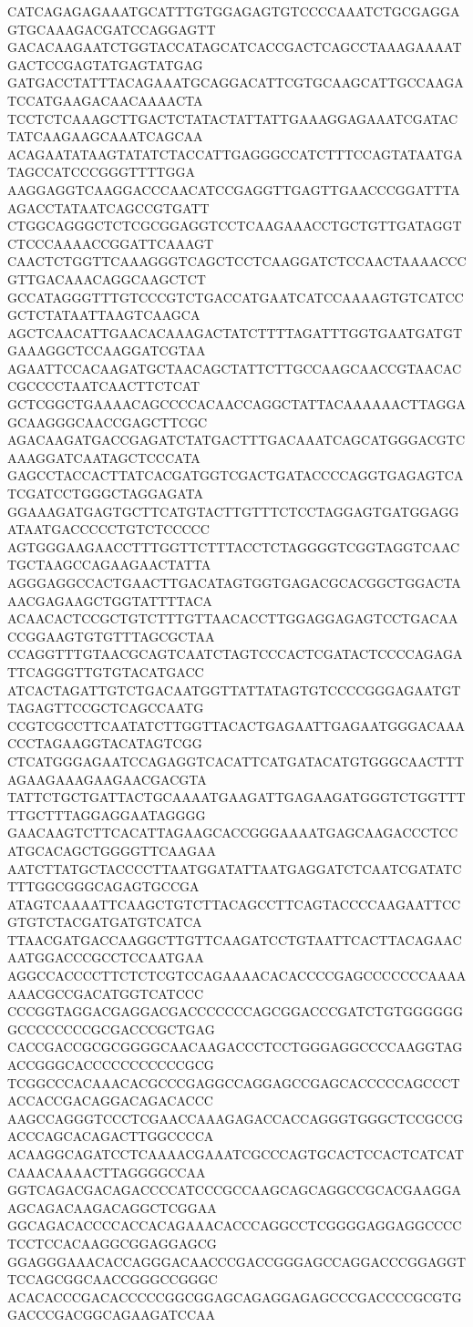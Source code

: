 CATCAGAGAGAAATGCATTTGTGGAGAGTGTCCCCAAATCTGCGAGGAGTGCAAAGACGATCCAGGAGTT
GACACAAGAATCTGGTACCATAGCATCACCGACTCAGCCTAAAGAAAATGACTCCGAGTATGAGTATGAG
GATGACCTATTTACAGAAATGCAGGACATTCGTGCAAGCATTGCCAAGATCCATGAAGACAACAAAACTA
TCCTCTCAAAGCTTGACTCTATACTATTATTGAAAGGAGAAATCGATACTATCAAGAAGCAAATCAGCAA
ACAGAATATAAGTATATCTACCATTGAGGGCCATCTTTCCAGTATAATGATAGCCATCCCGGGTTTTGGA
AAGGAGGTCAAGGACCCAACATCCGAGGTTGAGTTGAACCCGGATTTAAGACCTATAATCAGCCGTGATT
CTGGCAGGGCTCTCGCGGAGGTCCTCAAGAAACCTGCTGTTGATAGGTCTCCCAAAACCGGATTCAAAGT
CAACTCTGGTTCAAAGGGTCAGCTCCTCAAGGATCTCCAACTAAAACCCGTTGACAAACAGGCAAGCTCT
GCCATAGGGTTTGTCCCGTCTGACCATGAATCATCCAAAAGTGTCATCCGCTCTATAATTAAGTCAAGCA
AGCTCAACATTGAACACAAAGACTATCTTTTAGATTTGGTGAATGATGTGAAAGGCTCCAAGGATCGTAA
AGAATTCCACAAGATGCTAACAGCTATTCTTGCCAAGCAACCGTAACACCGCCCCTAATCAACTTCTCAT
GCTCGGCTGAAAACAGCCCCACAACCAGGCTATTACAAAAAACTTAGGAGCAAGGGCAACCGAGCTTCGC
AGACAAGATGACCGAGATCTATGACTTTGACAAATCAGCATGGGACGTCAAAGGATCAATAGCTCCCATA
GAGCCTACCACTTATCACGATGGTCGACTGATACCCCAGGTGAGAGTCATCGATCCTGGGCTAGGAGATA
GGAAAGATGAGTGCTTCATGTACTTGTTTCTCCTAGGAGTGATGGAGGATAATGACCCCCTGTCTCCCCC
AGTGGGAAGAACCTTTGGTTCTTTACCTCTAGGGGTCGGTAGGTCAACTGCTAAGCCAGAAGAACTATTA
AGGGAGGCCACTGAACTTGACATAGTGGTGAGACGCACGGCTGGACTAAACGAGAAGCTGGTATTTTACA
ACAACACTCCGCTGTCTTTGTTAACACCTTGGAGGAGAGTCCTGACAACCGGAAGTGTGTTTAGCGCTAA
CCAGGTTTGTAACGCAGTCAATCTAGTCCCACTCGATACTCCCCAGAGATTCAGGGTTGTGTACATGACC
ATCACTAGATTGTCTGACAATGGTTATTATAGTGTCCCCGGGAGAATGTTAGAGTTCCGCTCAGCCAATG
CCGTCGCCTTCAATATCTTGGTTACACTGAGAATTGAGAATGGGACAAACCCTAGAAGGTACATAGTCGG
CTCATGGGAGAATCCAGAGGTCACATTCATGATACATGTGGGCAACTTTAGAAGAAAGAAGAACGACGTA
TATTCTGCTGATTACTGCAAAATGAAGATTGAGAAGATGGGTCTGGTTTTTGCTTTAGGAGGAATAGGGG
GAACAAGTCTTCACATTAGAAGCACCGGGAAAATGAGCAAGACCCTCCATGCACAGCTGGGGTTCAAGAA
AATCTTATGCTACCCCTTAATGGATATTAATGAGGATCTCAATCGATATCTTTGGCGGGCAGAGTGCCGA
ATAGTCAAAATTCAAGCTGTCTTACAGCCTTCAGTACCCCAAGAATTCCGTGTCTACGATGATGTCATCA
TTAACGATGACCAAGGCTTGTTCAAGATCCTGTAATTCACTTACAGAACAATGGACCCGCCTCCAATGAA
AGGCCACCCCTTCTCTCGTCCAGAAAACACACCCCGAGCCCCCCCAAAAAAACGCCGACATGGTCATCCC
CCCGGTAGGACGAGGACGACCCCCCCAGCGGACCCGATCTGTGGGGGGGCCCCCCCCGCGACCCGCTGAG
CACCGACCGCGCGGGGCAACAAGACCCTCCTGGGAGGCCCCAAGGTAGACCGGGCACCCCCCCCCCCGCG
TCGGCCCACAAACACGCCCGAGGCCAGGAGCCGAGCACCCCCAGCCCTACCACCGACAGGACAGACACCC
AAGCCAGGGTCCCTCGAACCAAAGAGACCACCAGGGTGGGCTCCGCCGACCCAGCACAGACTTGGCCCCA
ACAAGGCAGATCCTCAAAACGAAATCGCCCAGTGCACTCCACTCATCATCAAACAAAACTTAGGGGCCAA
GGTCAGACGACAGACCCCATCCCGCCAAGCAGCAGGCCGCACGAAGGAAGCAGACAAGACAGGCTCGGAA
GGCAGACACCCCACCACAGAAACACCCAGGCCTCGGGGAGGAGGCCCCTCCTCCACAAGGCGGAGGAGCG
GGAGGGAAACACCAGGGACAACCCGACCGGGAGCCAGGACCCGGAGGTTCCAGCGGCAACCGGGCCGGGC
ACACACCCGACACCCCCGGCGGAGCAGAGGAGAGCCCGACCCCGCGTGGACCCGACGGCAGAAGATCCAA
